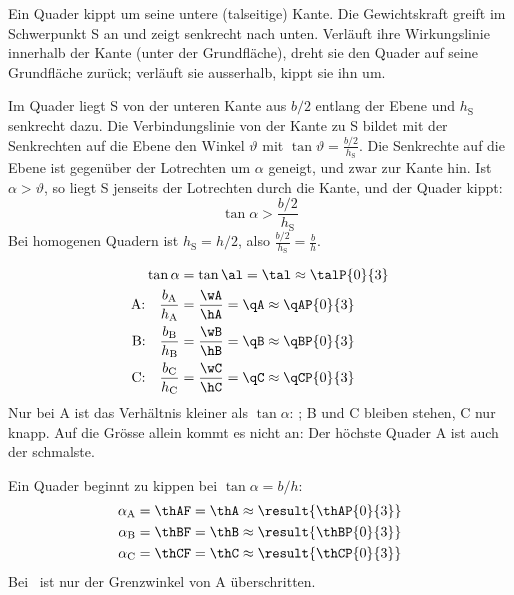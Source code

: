 \begin{abcliste}
\abc
Ein Quader kippt um seine untere (talseitige) Kante. Die Gewichtskraft greift im Schwerpunkt S an und zeigt senkrecht nach unten. Verläuft ihre Wirkungslinie innerhalb der Kante (unter der Grundfläche), dreht sie den Quader auf seine Grundfläche zurück; verläuft sie ausserhalb, kippt sie ihn um.

Im Quader liegt S von der unteren Kante aus $b/2$ entlang der Ebene und $h_\mathrm{S}$ senkrecht dazu. Die Verbindungslinie von der Kante zu S bildet mit der Senkrechten auf die Ebene den Winkel $\vartheta$ mit $\tan\vartheta = \frac{b/2}{h_\mathrm{S}}$. Die Senkrechte auf die Ebene ist gegenüber der Lotrechten um $\alpha$ geneigt, und zwar zur Kante hin. Ist $\alpha > \vartheta$, so liegt S jenseits der Lotrechten durch die Kante, und der Quader kippt:
\[
 \tan\alpha > \frac{b/2}{h_\mathrm{S}}
\]
Bei homogenen Quadern ist $h_\mathrm{S} = h/2$, also $\frac{b/2}{h_\mathrm{S}} = \frac{b}{h}$.

\abc
\begin{align}
 \tan\alpha &= \tan\al = \tal \approx \talP{0}{3}\\
 \text{A:}\quad \frac{b_\mathrm{A}}{h_\mathrm{A}} &= \frac{\wA}{\hA} = \qA \approx \qAP{0}{3}\\
 \text{B:}\quad \frac{b_\mathrm{B}}{h_\mathrm{B}} &= \frac{\wB}{\hB} = \qB \approx \qBP{0}{3}\\
 \text{C:}\quad \frac{b_\mathrm{C}}{h_\mathrm{C}} &= \frac{\wC}{\hC} = \qC \approx \qCP{0}{3}
\end{align}
Nur bei A ist das Verhältnis kleiner als $\tan\alpha$: ; B und C bleiben stehen, C nur knapp. Auf die Grösse allein kommt es nicht an: Der höchste Quader A ist auch der schmalste.

\abc
Ein Quader beginnt zu kippen bei $\tan\alpha = b/h$:
\begin{align}
 \alpha_\mathrm{A} &= \thAF = \thA \approx \result{\thAP{0}{3}}\\
 \alpha_\mathrm{B} &= \thBF = \thB \approx \result{\thBP{0}{3}}\\
 \alpha_\mathrm{C} &= \thCF = \thC \approx \result{\thCP{0}{3}}
\end{align}
Bei \alO\ ist nur der Grenzwinkel von A überschritten.
\end{abcliste}
